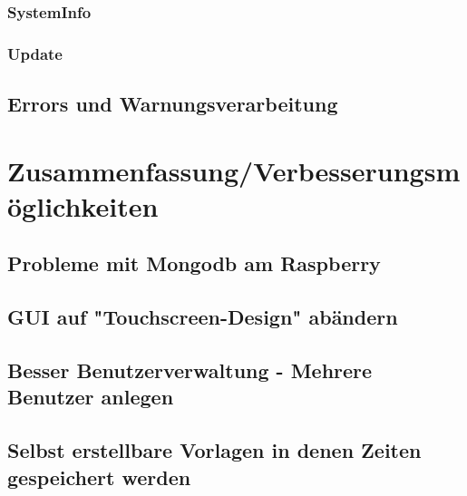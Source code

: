 \subsubsection{SystemInfo}
\subsubsection{Update}
\subsection{Errors und Warnungsverarbeitung}

\section{Zusammenfassung/Verbesserungsmöglichkeiten}
\subsection{Probleme mit Mongodb am Raspberry}
\subsection{GUI auf "Touchscreen-Design" abändern}
\subsection{Besser Benutzerverwaltung - Mehrere Benutzer anlegen}
\subsection{Selbst erstellbare Vorlagen in denen Zeiten gespeichert werden}
